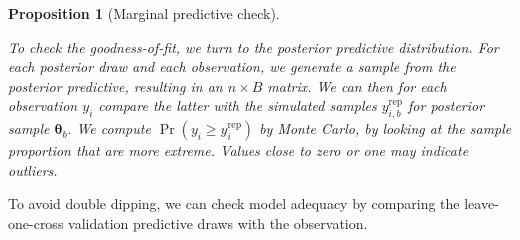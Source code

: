 \documentclass[
  11pt,
  letterpaper,
]{scrbook}
\theoremstyle{definition}
\theoremstyle{plain}
\newtheorem{proposition}{Proposition}[chapter]
\theoremstyle{plain}
\theoremstyle{plain}
\theoremstyle{definition}
\theoremstyle{definition}
\theoremstyle{plain}
\newtheorem{proposition}{Proposition}[chapter]
\theoremstyle{plain}
\theoremstyle{remark}
\begin{document}
\begin{proposition}[Marginal predictive
check]\protect\hypertarget{prp-marginal-pred-checks}{}\label{prp-marginal-pred-checks}

To check the goodness-of-fit, we turn to the posterior predictive
distribution. For each posterior draw and each observation, we generate
a sample from the posterior predictive, resulting in an \(n \times B\)
matrix. We can then for each observation \(y_i\) compare the latter with
the simulated samples \(y_{i,b}^{\mathrm{rep}}\) for posterior sample
\(\boldsymbol{\theta}_b.\) We compute
\(\Pr(y_i \geq y_{i}^{\mathrm{rep}})\) by Monte Carlo, by looking at the
sample proportion that are more extreme. Values close to zero or one may
indicate outliers.

\end{proposition}

To avoid double dipping, we can check model adequacy by comparing the
leave-one-cross validation predictive draws with the observation.
\end{document}
